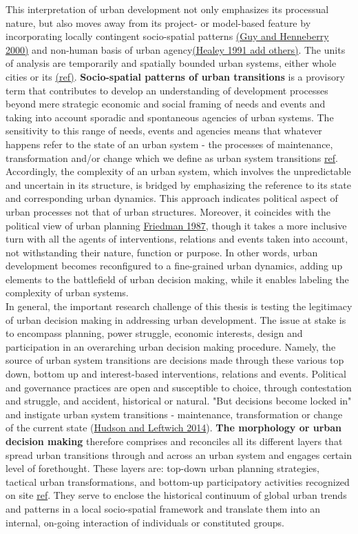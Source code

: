\documentclass[11pt]{report}
\begin{document}
This interpretation of urban development not only emphasizes its processual nature, but also moves away from its project- or model-based feature by incorporating locally contingent socio-spatial patterns \href{}{(Guy and Henneberry 2000)} and non-human basis of urban agency\href{}{(Healey 1991 add others)}. The units of analysis are temporarily and spatially bounded urban systems, either whole cities or its  \href{}{(ref)}. \textbf{Socio-spatial patterns of urban transitions} is a provisory term  that contributes to develop an understanding of development processes beyond mere strategic economic and social framing of needs and events and taking into account sporadic and spontaneous agencies of urban systems. The sensitivity to this range of needs, events and agencies means that whatever happens refer to the state of an urban system - the processes of maintenance, transformation and/or change which we define as urban system transitions \href{}{ref}. Accordingly, the complexity of an urban system, which involves the unpredictable and uncertain in its structure, is bridged by emphasizing the reference to its state and corresponding urban dynamics. This approach indicates political aspect of urban processes not that of urban structures. Moreover, it coincides with the political view of urban planning \href{}{Friedman 1987}, though it takes a more inclusive turn with all the agents of interventions, relations and events taken into account, not withstanding their nature, function or purpose. In other words, urban development becomes reconfigured to a fine-grained urban dynamics, adding up elements to the battlefield of urban decision making, while it enables labeling the complexity of urban systems.
\\
In general, the important research challenge of this thesis is testing the legitimacy of urban decision making in addressing urban development. The issue at stake is to encompass planning, power struggle, economic interests, design and participation in an overarching urban decision making procedure. Namely, the source of urban system transitions are decisions made through these various top down, bottom up and interest-based interventions, relations and events. Political and governance practices are open and susceptible to choice, through contestation and struggle, and accident, historical or natural. "But decisions become locked in" and instigate urban system transitions - maintenance, transformation or change of the current state (\href{}{Hudson and Leftwich 2014}). \textbf{The morphology or urban decision making} therefore comprises and reconciles all its different layers that spread urban transitions through and across an urban system and engages certain level of forethought. These layers are: top-down urban planning strategies, tactical urban transformations, and bottom-up participatory activities recognized on site \href{}{ref}. They serve to enclose the historical continuum of global urban trends and patterns in a local socio-spatial framework and translate them into an internal, on-going interaction of individuals or constituted groups.
\end{document}
